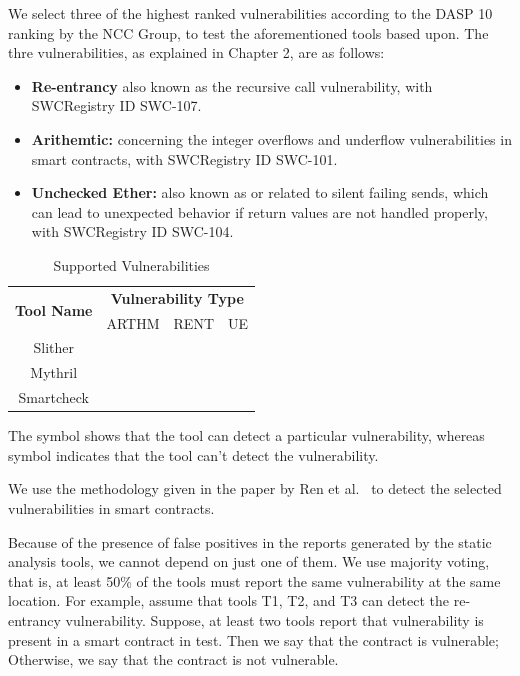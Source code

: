 	
	We select three of the highest ranked vulnerabilities according to the DASP 10 ranking by the NCC Group, to test the aforementioned tools based upon.
	The thre vulnerabilities, as explained in Chapter 2, are as follows:
	\begin{itemize}
		\item \textbf{Re-entrancy} also known as the recursive call vulnerability, with SWCRegistry ID SWC-107.
		\item \textbf{Arithemtic:} concerning the integer overflows and underflow vulnerabilities in smart contracts, with SWCRegistry ID SWC-101.
		\item \textbf{Unchecked Ether:} also known as or related to silent failing sends, which can lead to unexpected behavior if return values are not handled properly, with SWCRegistry ID SWC-104.
	\end{itemize} 
	
	\begin{table}[t]
		\caption{Supported Vulnerabilities}
		\label{tab:freq}
		\begin{tabular}{cccc}
	  
	  \multirow{2}{*}{\textbf{Tool Name}} & \multicolumn{3}{c}{\textbf{Vulnerability Type}} \\
		 & ARTHM & RENT & UE \\ \midrule
		  Slither    & \crossmark  &  \checkmark  &  \checkmark  \\
		  Mythril    & \checkmark  &  \checkmark  &  \checkmark  \\
		  Smartcheck & \checkmark  &  \crossmark  &  \checkmark  \\
		  \bottomrule
	  \end{tabular}
	  \label{table:vuln_supported_per_tool}
	  \end{table}
	
	
	The \checkmark symbol shows that the tool can detect a particular vulnerability, whereas symbol \crossmark indicates that the tool can't detect the vulnerability.
	
	We use the methodology given in the paper by Ren et al.~\cite{Making-Smart-Contract-Development-More-Secure-and-Easier} to detect the selected vulnerabilities in smart contracts.
	
	Because of the presence of false positives in the reports generated by the static analysis tools, we cannot depend on just one of them.
	We use majority voting, that is, at least 50\% of the tools must report the same vulnerability at the same location.
	For example, assume that tools T1, T2, and T3 can detect the re-entrancy vulnerability.
	Suppose, at least two tools report that vulnerability is present in a smart contract in test.
	Then we say that the contract is vulnerable;
	Otherwise, we say that the contract is not vulnerable.
	
